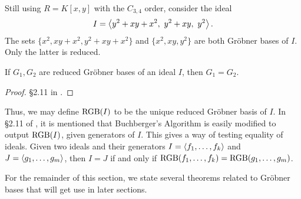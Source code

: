 \begin{example}
  \label{ex_groebner_4}
  Still using $R = K[x,y]$ with the $C_{3,4}$ order,
  consider the ideal
  \[I = \left\langle y^2 + xy + x^2, ~y^2 + xy, ~y^2 \right\rangle.\]
  The sets $\{x^2, xy + x^2, y^2 + xy + x^2\}$ and $\{x^2, xy, y^2\}$ are both Gr\"obner bases of $I$.
  Only the latter is reduced.
\end{example}

\begin{theorem}
  If $G_1, G_2$ are reduced Gr\"obner bases of an ideal $I$, then $G_1 = G_2$.
\end{theorem}
\begin{proof}
  \S 2.11 in \cite{buchberger98}.
\end{proof}

Thus, we may define $\operatorname{RGB}(I)$ to be the unique reduced Gr\"obner basis of $I$.
In \S 2.11 of \cite{buchberger98}, it is mentioned that Buchberger's Algorithm is easily modified
to output $\operatorname{RGB}(I)$, given generators of $I$.
This gives a way of testing equality of ideals.
Given two ideals and their generators $I = \left\langle f_1, \ldots, f_k \right\rangle$ and $J = \left\langle g_1, \ldots, g_m \right\rangle$,
then $I = J$ if and only if $\operatorname{RGB}(f_1, \ldots, f_k) = \operatorname{RGB}(g_1, \ldots, g_m)$.

For the remainder of this section, we state several theorems related to Gr\"obner bases
that will get use in later sections.

